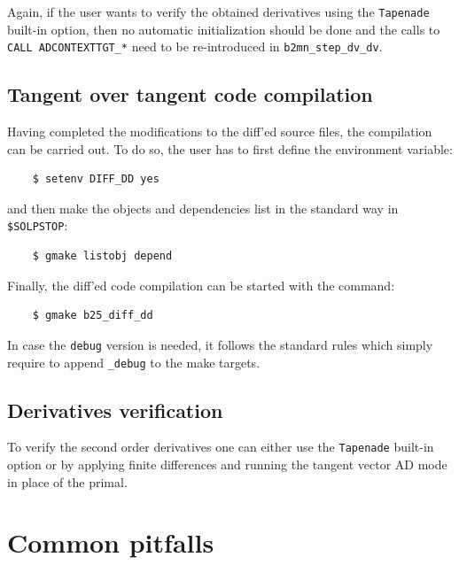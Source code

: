 Again, if the user wants to verify the obtained derivatives using the {\tt Tapenade} built-in option, then no automatic initialization should be done and the calls to {\tt CALL ADCONTEXTTGT\_*} need to be re-introduced in {\tt b2mn\_step\_dv\_dv}.

\subsection{Tangent over tangent code compilation}

Having completed the modifications to the diff'ed source files, the compilation can be carried out. To do so, the user has to first define the environment variable:
\begin{verbatim}
	$ setenv DIFF_DD yes
\end{verbatim}
and then make the objects and dependencies list in the standard way in {\tt \$SOLPSTOP}:
\begin{verbatim}
	$ gmake listobj depend
\end{verbatim}
Finally, the diff'ed code compilation can be started with the command:
\begin{verbatim}
	$ gmake b25_diff_dd
\end{verbatim}

In case the {\tt debug} version is needed, it follows the standard \SOLPSITER rules which simply require to append {\tt \_debug} to the make targets.

\subsection{Derivatives verification}

To verify the second order derivatives one can either use the {\tt Tapenade} built-in option or by applying finite differences and running the tangent vector AD mode in place of the primal.

\section{Common pitfalls}\label{sec:errors_ad}

